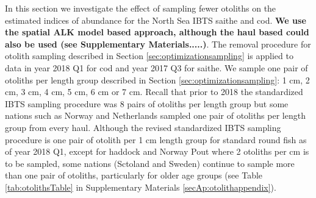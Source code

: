 \documentclass[a4paper 12pt]{article}
\numberwithin{equation}{section}
\begin{document}

In this section we investigate the effect of sampling fewer otoliths on the estimated indices of abundance for the North Sea IBTS saithe and cod. {\bf We use the spatial ALK model based approach, although the haul based could also be used (see Supplementary Materials.....)}. The removal procedure for otolith sampling described in Section \ref{sec:optimizationsampling} is applied to data in year 2018 Q1 for cod and year 2017 Q3 for saithe. We sample one pair of otoliths per length group described in Section \ref{sec:optimizationsampling}: 1 cm, 2 cm, 3 cm, 4 cm, 5 cm, 6 cm or 7 cm. Recall that prior to 2018 the standardized IBTS sampling procedure was 8 pairs of otoliths per length group but some nations such as Norway and Netherlands sampled one pair of otoliths per length group from every haul. Although the revised standardized IBTS sampling procedure is one pair of otolith per 1 cm length group for standard round fish as of year 2018 Q1, except for haddock and Norway Pout where 2 otoliths per cm is to be sampled, some nations (Sctoland and Sweden) continue to sample more than one pair of otoliths, particularly for older age groups (see Table \ref{tab:otolithsTable} in Supplementary Materials \ref{secAp:otolithappendix}).
\end{document}
